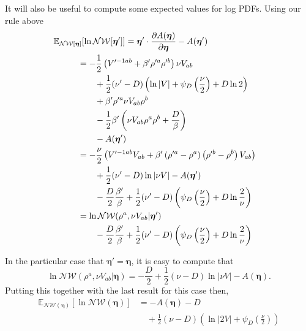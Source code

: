 \documentclass[aps,showpacs,twocolumn,prd,superscriptaddress,nofootinbib]{revtex4}
\newcommand{\be}{\begin{equation}}
\newcommand{\ee}{\end{equation}}
\newcommand{\nn}{\nonumber}
\newcommand{\E}[1]{{\mathbb E}_{#1}\!}
\begin{document}
It will also be useful to compute some expected values for log PDFs. Using our rule above
\begin{align*}
  \E{\mathcal {NW}[\bm\eta]}\left[\ln\mathcal{NW}[\bm\eta']\right]
  \mkern-100mu &\mkern100mu =\bm\eta' \cdot \frac{\partial A(\bm\eta)}{\partial\bm\eta} -A({\bm\eta'})&\\
  \qquad&=
  -\frac12\left(V'^{-1ab}+\beta'\rho'^a\rho'^b\right){\nu}V_{ab}\\
  &\qquad+\frac12(\nu'-D)\left(\ln\left|V\right|+\psi_D\left(\frac\nu2\right)+D\ln2\right)\\
  &\qquad+\beta'\rho'^a\nu V_{ab}\rho^b\\
  &\qquad-\frac12\beta'\left(\nu V_{ab}\rho^a\rho^b+\frac D\beta\right)\\
  &\qquad-A({\bm\eta'})\\
  &=
  -\frac\nu2\left(V'^{-1ab}V_{ab}+\beta'\left(\rho'^a-\rho^a\right)\left(\rho'^b-\rho^b\right)V_{ab}\right)\\
  &\qquad+\frac12(\nu'-D)\ln\left|\nu V\right|-A({\bm\eta'})\\
  &\qquad-\frac D2\frac{\beta'}\beta+\frac12(\nu'-D)\left(\psi_D\left(\frac\nu2\right)+D\ln\frac2\nu\right)\\
  &=\ln\mathcal {NW}(\rho^a,\nu V_{ab}|\bm\eta')\\
  &\qquad-\frac D2\frac{\beta'}\beta+\frac12(\nu'-D)\left(\psi_D\left(\frac\nu2\right)+D\ln\frac2\nu\right)
\end{align*}

In the particular case that $\bm\eta'=\bm\eta$, it is easy to compute that
\be
\ln\mathcal {NW}\left(\rho^a,\nu V_{ab}|\bm\eta\right)=-\frac D2+\frac12(\nu-D)\ln\left|\nu V\right|-A({\bm\eta}).\nn
\ee
Putting this together with the last result for this case then,
\begin{align}
  \E{\mathcal {NW}\left(\bm\eta\right)}\left[\ln\mathcal{NW}\left(\bm\eta\right)\right]
  &=
  -A({\bm\eta})-D\nn\\
  &\quad +\frac12(\nu-D)\left(\ln\left|2V\right|+\psi_D\left(\frac\nu2\right)\right)\label{eq:ElnNW}
\end{align}
\end{document}
